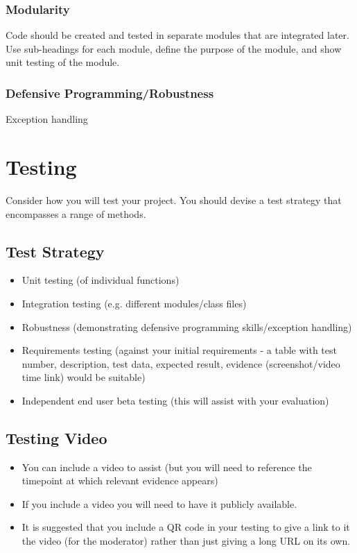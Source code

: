 \documentclass{article}
\begin{document}
\subsubsection{Modularity}
Code should be created and tested in separate modules that are integrated later. Use sub-headings for each module, define the purpose of the module, and show unit testing of the module.

\subsubsection{Defensive Programming/Robustness}
Exception handling

\section{Testing}
Consider how you will test your project. You should devise a test strategy that encompasses a range of methods.

\subsection{Test Strategy}
\begin{itemize}
    \item Unit testing (of individual functions)
    \item Integration testing (e.g. different modules/class files)
    \item Robustness (demonstrating defensive programming skills/exception handling)
    \item Requirements testing (against your initial requirements - a table with test number, description, test data, expected result, evidence (screenshot/video time link) would be suitable)
    \item Independent end user beta testing (this will assist with your evaluation)
\end{itemize}

\subsection{Testing Video}
\begin{itemize}
    \item You can include a video to assist (but you will need to reference the timepoint at which relevant evidence appears)
    \item If you include a video you will need to have it publicly available.
    \item It is suggested that you include a QR code in your testing to give a link to it the video (for the moderator) rather than just giving a long URL on its own.
\end{itemize}
\end{document}
